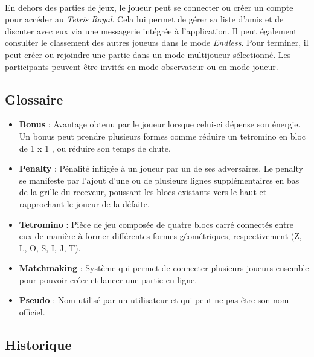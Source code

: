 \documentclass{article}
\begin{document}
\paragraph*{}

En dehors des parties de jeux, le joueur peut se connecter ou créer un compte pour accéder au \textit{Tetris Royal}. Cela lui permet de gérer sa liste d'amis et de discuter avec eux via une messagerie intégrée à l'application. Il peut également consulter le classement des autres joueurs dans le mode \textit{Endless}. Pour terminer, il peut créer ou rejoindre une partie dans un mode multijoueur sélectionné. Les participants peuvent être invités en mode observateur ou en mode joueur.

\newpage

\subsection{Glossaire}


\begin{itemize}
	\item \textbf{Bonus} : Avantage obtenu par le joueur lorsque celui-ci dépense son énergie. Un bonus peut prendre plusieurs formes comme réduire un tetromino en bloc de 1 x 1 , ou réduire son temps de chute. 
	\item \textbf{Penalty} : Pénalité infligée à un joueur par un de ses adversaires. Le penalty se manifeste par l'ajout d'une ou de plusieurs lignes supplémentaires en bas de la grille du receveur, poussant les blocs existants vers le haut et rapprochant le joueur de la défaite.
	\item \textbf{Tetromino} : Pièce de jeu composée de quatre blocs carré connectés entre eux de manière à former différentes formes géométriques, respectivement (Z, L, O, S, I, J, T). 
        \item \textbf{Matchmaking} : Système qui permet de connecter plusieurs joueurs ensemble pour pouvoir créer et lancer une partie en ligne.
        \item \textbf{Pseudo} : Nom utilisé par un utilisateur et qui peut ne pas être son nom officiel.
	
\end{itemize}

\subsection{Historique}
\end{document}
